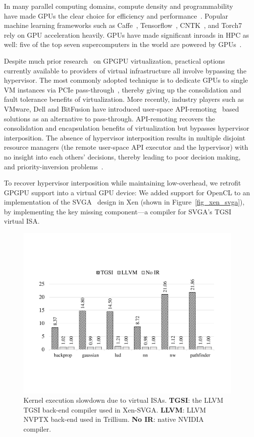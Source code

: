 In many parallel computing domains, compute density and
programmability~\cite{nvidia_cuda, stone2010opencl, gregory2014c++} have
made GPUs the clear choice for efficiency and performance~\cite{gpu_apps}.
Popular machine learning frameworks such as Caffe~\cite{jia2014caffe},
Tensorflow~\cite{abadi2016tensorflow}, CNTK~\cite{yu2014introduction}, and
Torch7~\cite{collobert2011torch7} rely on GPU acceleration heavily. GPUs have
made significant inroads in HPC as well: five of the top seven supercomputers
in the world are powered by GPUs~\cite{top500-Nov2018}.

Despite much prior research~\cite{rossbach16vee, kaveri16vee,
cc-numa-gpu-hpca15, abhishek-ispass16} on GPGPU virtualization, practical
options currently available to providers of virtual infrastructure all involve
bypassing the hypervisor.
The most commonly adopted technique is to dedicate GPUs to single VM instances
via PCIe pass-through~\cite{AWS-gpu,gVirt}, thereby giving up the
consolidation and fault tolerance benefits of virtualization.
More recently, industry players such as VMware, Dell and BitFusion have
introduced user-space API-remoting~\cite{bitfusion-whitepaper,kim2012snucl,
rCUDAnew, vmCUDA,rCUDA} based solutions as an alternative to pass-through.
API-remoting recovers the consolidation and encapsulation benefits
of virtualization but bypasses hypervisor interposition.
The absence of hypervisor interposition results in multiple disjoint resource
managers (the remote user-space API executor and the hypervisor) with no
insight into each others' decisions, thereby leading to poor decision making,
and priority-inversion problems~\cite{rossbach2011ptask}.

To recover hypervisor interposition while maintaining low-overhead,
we retrofit GPGPU support into a virtual GPU device:
We added support for OpenCL to an implementation of the
SVGA~\cite{dowty2009gpu} design in Xen (shown in Figure~\ref{fig_xen_svga}),
by implementing the key missing component---a compiler for SVGA's TGSI virtual
ISA.

\begin{figure}[!ht]
	\centering
	\captionsetup{width=0.8\linewidth}
	\includegraphics[width=.6\linewidth,trim={2cm 4.5cm 2cm 5cm},clip]{figures/trillium_visa.pdf}
	\caption{
		Kernel execution slowdown due to virtual ISAs.
		\textbf{TGSI}: the LLVM TGSI back-end compiler used in Xen-SVGA.
		\textbf{LLVM}: LLVM NVPTX back-end used in Trillium.
		\textbf{No IR}: native NVIDIA compiler.
		}
	\label{fig_trillium_kernel}
\end{figure}

